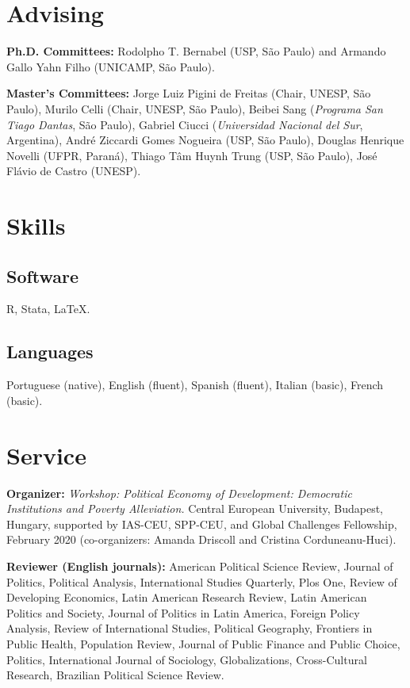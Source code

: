 \documentclass[a4paper,11.5pt]{article}
\renewenvironment{itemize}{
	\begin{list}{}{
			\setlength{\leftmargin}{1.5em}
		}
		}{
	\end{list}
}
\begin{document}
\section*{Advising}

\textbf{Ph.D. Committees:}  Rodolpho T. Bernabel (USP, São Paulo) and  Armando Gallo Yahn Filho (UNICAMP, São Paulo).

\textbf{Master's Committees:} Jorge Luiz Pigini de Freitas (Chair, UNESP, São Paulo), 
Murilo Celli (Chair, UNESP, São Paulo), Beibei Sang (\emph{Programa San Tiago Dantas}, São Paulo), Gabriel Ciucci (\emph{Universidad Nacional del Sur}, Argentina), André Ziccardi Gomes Nogueira (USP, São Paulo), Douglas Henrique Novelli (UFPR, Paraná), Thiago Tâm Huynh Trung (USP, São Paulo), José Flávio de Castro (UNESP).

\section*{Skills}

\subsection*{Software}

\begin{itemize}
	\item R, Stata, \LaTeX{}.
\end{itemize}

\subsection*{Languages}

\begin{itemize}
	\item Portuguese (native), English (fluent), Spanish (fluent), Italian (basic), French (basic).
\end{itemize}

\section*{Service}

\begin{itemize}
	\item \textbf{Organizer:} \emph{Workshop: Political Economy of Development: Democratic Institutions and Poverty Alleviation.} Central European University, Budapest, Hungary, supported by IAS-CEU, SPP-CEU, and Global Challenges Fellowship, February 2020 (co-organizers: Amanda Driscoll and Cristina Corduneanu-Huci).
	\item \textbf{Reviewer (English journals):} American Political Science Review, Journal of Politics, Political Analysis, International Studies Quarterly, Plos One, Review of Developing Economics, Latin American Research Review, Latin American Politics and Society, Journal of Politics in Latin America,  Foreign Policy Analysis, Review of  International Studies, Political Geography, Frontiers in Public Health, Population Review,  Journal of Public Finance and Public Choice, Politics,  International Journal of Sociology, Globalizations, Cross-Cultural Research, Brazilian Political Science Review.
\end{itemize}
\end{document}

